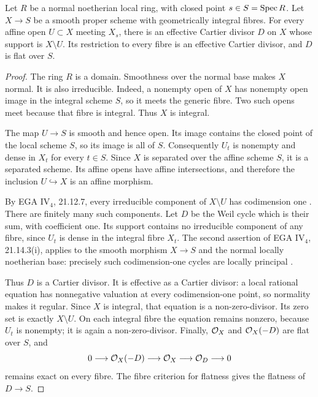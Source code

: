 \begin{lemma}\label{lem:normal-affine-relative-boundary}
Let $R$ be a normal noetherian local ring, with closed point
$s\in S=\operatorname{Spec} R$. Let $X\to S$ be a smooth proper scheme with
geometrically integral fibres. For every affine open $U\subset X$
meeting $X_s$, there is an effective Cartier divisor $D$ on $X$
whose support is $X\setminus U$. Its restriction to every fibre is
an effective Cartier divisor, and $D$ is flat over $S$.
\end{lemma}

\begin{proof}
The ring $R$ is a domain. Smoothness over the normal base makes $X$
normal. It is also irreducible. Indeed, a nonempty open of $X$ has
nonempty open image in the integral scheme $S$, so it meets the
generic fibre. Two such opens meet because that fibre is integral.
Thus $X$ is integral.

The map $U\to S$ is smooth and hence open. Its image contains the
closed point of the local scheme $S$, so its image is all of $S$.
Consequently $U_t$ is nonempty and dense in $X_t$ for every $t\in S$.
Since $X$ is separated over the affine scheme $S$, it is a separated
scheme. Its affine opens have affine intersections, and therefore
the inclusion $U\hookrightarrow X$ is an affine morphism.

By EGA IV$_4$, 21.12.7, every irreducible component of $X\setminus U$
has codimension one \cite[pp.~307--308]{EGA}. There are finitely many
such components. Let $D$ be the Weil cycle which is their sum, with
coefficient one. Its support contains no irreducible component of
any fibre, since $U_t$ is dense in the integral fibre $X_t$.
The second assertion of EGA IV$_4$, 21.14.3(i), applies to the smooth
morphism $X\to S$ and the normal locally noetherian base: precisely
such codimension-one cycles are locally principal
\cite[pp.~325--328]{EGA}.

Thus $D$ is a Cartier divisor. It is effective as a Cartier divisor:
a local rational equation has nonnegative valuation at every
codimension-one point, so normality makes it regular. Since $X$ is
integral, that equation is a non-zero-divisor. Its zero set is exactly
$X\setminus U$. On each integral fibre the equation remains nonzero,
because $U_t$ is nonempty; it is again a non-zero-divisor. Finally,
$\mathcal O_X$ and $\mathcal O_X(-D)$ are flat over $S$, and
\[
 0\longrightarrow\mathcal O_X(-D)\longrightarrow\mathcal O_X
 \longrightarrow\mathcal O_D\longrightarrow0
\]
remains exact on every fibre. The fibre criterion for flatness gives
the flatness of $D\to S$.
\end{proof}

